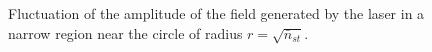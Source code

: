 \begin{figure}
\centering

\caption{Fluctuation of the amplitude of the field generated by the laser in a narrow region near the circle of radius $r=\sqrt{\bar{n}_{st}}$.}
\label{figPart2Ch1_7}
\end{figure}